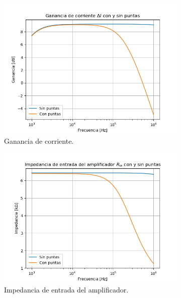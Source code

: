 \begin{figure}[H]
\centering
\begin{subfigure}{.47\textwidth}
\centering
	\includegraphics[width=\textwidth]{Imagenes/Ai_cp.png}
	\caption{Ganancia de corriente.}
	\label{fig:ai-cp}
\end{subfigure}
\begin{subfigure}{.47\textwidth}
\centering
	\includegraphics[width=\textwidth]{Imagenes/Ria_cp.png}
	\caption{Impedancia de entrada del amplificador.}
	\label{fig:ria-cp}
\end{subfigure}
\begin{subfigure}{.5\textwidth}
\centering

\end{subfigure}
\end{figure}

